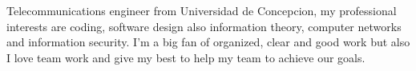\begin{center}
    Telecommunications engineer from Universidad de Concepcion, my professional interests are coding, software design also information theory, computer networks and information security. I'm a big fan of organized, clear and good work but also I love team work and give my best to help my team to achieve our goals.
\end{center}
        
